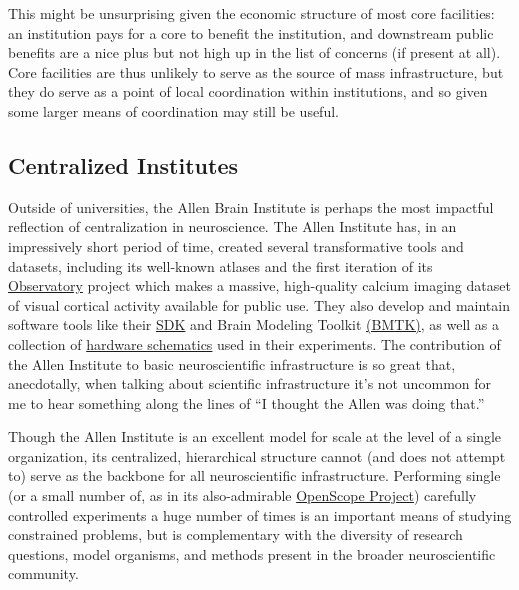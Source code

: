 This might be unsurprising given the economic structure of most core
facilities: an institution pays for a core to benefit the institution,
and downstream public benefits are a nice plus but not high up in the
list of concerns (if present at all). Core facilities are thus unlikely
to serve as the source of mass infrastructure, but they do serve as a
point of local coordination within institutions, and so given some
larger means of coordination may still be useful.

\hypertarget{centralized-institutes}{%
\subsection{Centralized Institutes}\label{centralized-institutes}}

Outside of universities, the Allen Brain Institute is perhaps the most
impactful reflection of centralization in neuroscience. The Allen
Institute has, in an impressively short period of time, created several
transformative tools and datasets, including its well-known atlases \citep{leinGenomewideAtlasGene2007}  and the first iteration of its
\href{http://observatory.brain-map.org/}{Observatory} project which
makes a massive, high-quality calcium imaging dataset of visual cortical
activity available for public use. They also develop and maintain
software tools like their
\href{https://allensdk.readthedocs.io/en/latest/}{SDK} and Brain
Modeling Toolkit \href{https://alleninstitute.github.io/bmtk/}{(BMTK)},
as well as a collection of
\href{https://portal.brain-map.org/explore/toolkit/hardware}{hardware
schematics} used in their experiments. The contribution of the Allen
Institute to basic neuroscientific infrastructure is so great that,
anecdotally, when talking about scientific infrastructure it's not
uncommon for me to hear something along the lines of ``I thought the
Allen was doing that.''

Though the Allen Institute is an excellent model for scale at the level
of a single organization, its centralized, hierarchical structure cannot
(and does not attempt to) serve as the backbone for all neuroscientific
infrastructure. Performing single (or a small number of, as in its
also-admirable
\href{https://alleninstitute.org/what-we-do/brain-science/news-press/articles/three-collaborative-studies-launch-openscope-shared-observatory-neuroscience}{OpenScope
Project}) carefully controlled experiments a huge number of times is an
important means of studying constrained problems, but is complementary
with the diversity of research questions, model organisms, and methods
present in the broader neuroscientific community.

